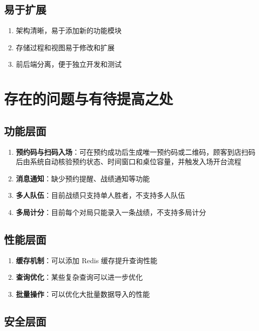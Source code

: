\subsection{易于扩展}

\begin{enumerate}
  \item 架构清晰，易于添加新的功能模块
  \item 存储过程和视图易于修改和扩展
  \item 前后端分离，便于独立开发和测试
\end{enumerate}

\section{存在的问题与有待提高之处}

\subsection{功能层面}

\begin{enumerate}
  \item \textbf{预约码与扫码入场}：可在预约成功后生成唯一预约码或二维码，顾客到店扫码后由系统自动核验预约状态、时间窗口和桌位容量，并触发入场开台流程
  \item \textbf{消息通知}：缺少预约提醒、战绩通知等功能
  \item \textbf{多人队伍}：目前战绩只支持单人胜者，不支持多人队伍
  \item \textbf{多局计分}：目前每个对局只能录入一条战绩，不支持多局计分
\end{enumerate}

\subsection{性能层面}

\begin{enumerate}
  \item \textbf{缓存机制}：可以添加 Redis 缓存提升查询性能
  \item \textbf{查询优化}：某些复杂查询可以进一步优化
  \item \textbf{批量操作}：可以优化大批量数据导入的性能
\end{enumerate}

\subsection{安全层面}

